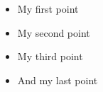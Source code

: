 \documentclass{beamer}
\begin{document}
\begin{frame}

{
    \begin{itemize}[<+-|alert@+>]
        \item My first point
        \item My second point
        \item My third point
        \item And my last point
    \end{itemize}
}
\end{frame} 
\end{document}
